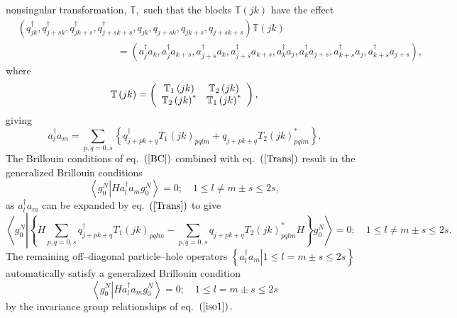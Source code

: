 \documentclass[aps,preprint]{revtex4}%
\begin{document}
nonsingular transformation, $\mathbb{T},$ such that the blocks $\mathbb{T}%
\left(  jk\right)  $ have the effect
\begin{align}
&  \left(  q_{jk}^{\dagger},q_{j+sk}^{\dagger},q_{jk+s}^{\dagger}%
,q_{j+sk+s}^{\dagger},q_{jk},q_{j+sk},q_{jk+s},q_{j+sk+s}\right)
\mathbb{T}\left(  jk\right) \nonumber\\
&  \qquad\qquad\qquad\qquad\qquad\left.  =\right.  \left(  a_{j}^{\dagger
}a_{k},a_{j}^{\dagger}a_{k+s},a_{j+s}^{\dagger}a_{k},a_{j+s}^{\dagger}%
a_{k+s},a_{k}^{\dagger}a_{j},a_{k}^{\dagger}a_{j+s},a_{k+s}^{\dagger}%
a_{j},a_{k+s}^{\dagger}a_{j+s}\right)  ,
\end{align}
where
\begin{equation}
\mathbb{T}\left(  jk\right)  =\left(
\begin{array}
[c]{cc}%
\mathbb{T}_{1}\left(  jk\right)  & \mathbb{T}_{2}\left(  jk\right) \\
\mathbb{T}_{2}\left(  jk\right)  ^{\ast} & \mathbb{T}_{1}\left(  jk\right)
^{\ast}%
\end{array}
\right)  ,
\end{equation}
giving
\begin{equation}
a_{l}^{\dagger}a_{m}=\sum_{p,q=0,s}\left\{  q_{j+pk+q}^{\dagger}T_{1}\left(
jk\right)  _{pqlm}+q_{j+pk+q}T_{2}\left(  jk\right)  _{pqlm}^{\ast}\right\}  .
\label{Trans}%
\end{equation}
The Brillouin conditions of eq.\ $\left(  \ref{BC}\right)  $ combined with
eq.\ $\left(  \ref{Trans}\right)  $ result in the generalized Brillouin
conditions
\begin{equation}
\left\langle g_{0}^{N}\left\vert Ha_{l}^{\dagger}a_{m}\right.  g_{0}%
^{N}\right\rangle =0;\quad1\leq l\neq m\pm s\leq2s, \label{GBC}%
\end{equation}
as $a_{l}^{\dagger}a_{m}$ can be expanded by eq.\ $\left(  \ref{Trans}\right)
$ to give%
\begin{equation}
\left\langle g_{0}^{N}\left\vert \left\{  H\sum_{p,q=0,s}q_{j+pk+q}^{\dagger
}T_{1}\left(  jk\right)  _{pqlm}-\sum_{p,q=0,s}q_{j+pk+q}T_{2}\left(
jk\right)  _{pqlm}^{\ast}H\right\}  g_{0}^{N}\right.  \right\rangle
=0;\quad1\leq l\neq m\pm s\leq2s.
\end{equation}
The remaining off--diagonal particle--hole operators $\left\{  \left.
a_{l}^{\dagger}a_{m}\right\vert 1\leq l=m\pm s\leq2s\right\}  $ automatically
satisfy a generalized Brillouin condition
\begin{equation}
\left\langle g_{0}^{N}\left\vert Ha_{l}^{\dagger}a_{m}g_{0}^{N}\right.
\right\rangle =0;\quad1\leq l=m\pm s\leq2s \label{ph}%
\end{equation}
by the invariance group relationships of eq.\ $\left(  \ref{iso1}\right)  .$
\end{document}

